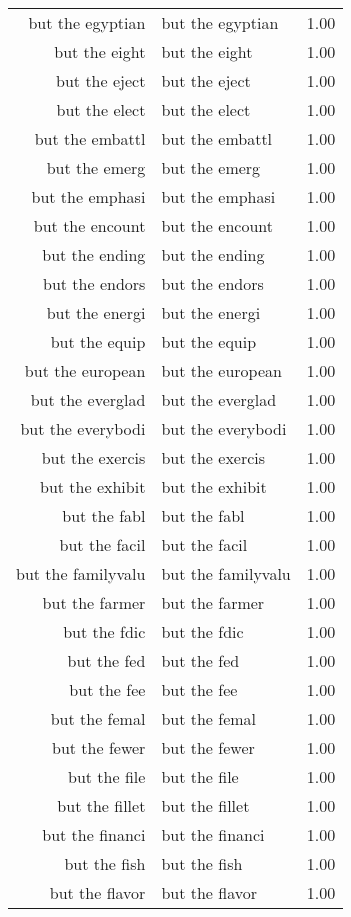 \begin{table}[ht]
\begin{tabular}{rlr}
  but the egyptian & but the egyptian & 1.00 \\ 
  but the eight & but the eight & 1.00 \\ 
  but the eject & but the eject & 1.00 \\ 
  but the elect & but the elect & 1.00 \\ 
  but the embattl & but the embattl & 1.00 \\ 
  but the emerg & but the emerg & 1.00 \\ 
  but the emphasi & but the emphasi & 1.00 \\ 
  but the encount & but the encount & 1.00 \\ 
  but the ending & but the ending & 1.00 \\ 
  but the endors & but the endors & 1.00 \\ 
  but the energi & but the energi & 1.00 \\ 
  but the equip & but the equip & 1.00 \\ 
  but the european & but the european & 1.00 \\ 
  but the everglad & but the everglad & 1.00 \\ 
  but the everybodi & but the everybodi & 1.00 \\ 
  but the exercis & but the exercis & 1.00 \\ 
  but the exhibit & but the exhibit & 1.00 \\ 
  but the fabl & but the fabl & 1.00 \\ 
  but the facil & but the facil & 1.00 \\ 
  but the familyvalu & but the familyvalu & 1.00 \\ 
  but the farmer & but the farmer & 1.00 \\ 
  but the fdic & but the fdic & 1.00 \\ 
  but the fed & but the fed & 1.00 \\ 
  but the fee & but the fee & 1.00 \\ 
  but the femal & but the femal & 1.00 \\ 
  but the fewer & but the fewer & 1.00 \\ 
  but the file & but the file & 1.00 \\ 
  but the fillet & but the fillet & 1.00 \\ 
  but the financi & but the financi & 1.00 \\ 
  but the fish & but the fish & 1.00 \\ 
  but the flavor & but the flavor & 1.00 \\ 

\end{tabular}
\end{table}
